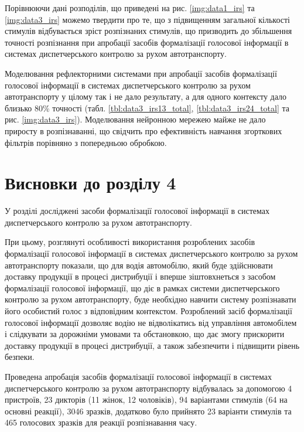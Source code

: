 Порівнюючи дані розподілів, що приведені на рис. \ref{img:data1_irs} та \ref{img:data3_irs} можемо твердити про те, що з підвищенням загальної кількості стимулів відбувається зріст розпізнаних стимулів, що призводить до збільшення точності розпізнання при апробації засобів формалізації голосової інформації в системах диспетчерського контролю за рухом автотранспорту.

Моделювання рефлекторними системами при апробації засобів формалізації голосової інформації в системах диспетчерського контролю за рухом автотранспорту у цілому так і не дало результату, а для одного контексту дало близько 80\% точності (табл. \ref{tbl:data3_irs13_total}, \ref{tbl:data3_irs24_total} та рис. \ref{img:data3_irs}). Моделювання нейронною мережею майже не дало приросту в розпізнаванні, що свідчить про ефективність навчання згорткових фільтрів порівняно з попередньою обробкою.

\section*{Висновки до розділу 4}

У розділі досліджені засоби формалізації голосової інформації в системах диспетчерського контролю за рухом автотранспорту.

При цьому, розглянуті особливості використання розроблених засобів формалізації голосової інформації в системах диспетчерського контролю за рухом автотранспорту показали, що для водія автомобілю, який буде здійснювати доставку продукції в процесі дистрибуції і вперше зіштовхнеться з засобом формалізації голосової інформації, що діє в рамках системи диспетчерського контролю за рухом автотранспорту, буде необхідно навчити систему розпізнавати його особистий голос з відповідним контекстом. Розроблений засіб формалізації голосової інформації дозволяє водію не відволікатись від управління автомобілем і слідкувати за дорожніми умовами та обстановкою, що дає змогу прискорити доставку продукції в процесі дистрибуції, а також забезпечити і підвищити рівень безпеки.

Проведена апробація засобів формалізації голосової інформації в системах диспетчерського контролю за рухом автотранспорту відбувалась за допомогою 4 пристроїв, 23 дикторів (11 жінок, 12 чоловіків), 94 варіантами стимулів (64 на основні реакції), 3046 зразків, додатково було прийнято 23 варіанти стимулів та 465 голосових зразків для реакції розпізнавання часу.

